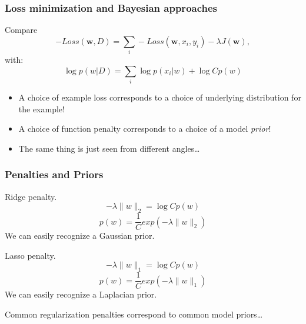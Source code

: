 \documentclass[usenames,dvipsnames]{beamer}
\newcommand{\w}{\mathbf{w}}
\newcommand{\voc}[1]{\emph{\color{ForestGreen}#1}}
\begin{document}
\begin{frame}\frametitle{Loss minimization and Bayesian approaches}

Compare
\begin{equation*}
-Loss(\w, D) = \sum_i - Loss(\w, x_i, y_i) - \lambda J(\w),
\end{equation*}
with:
\begin{equation*}
\log p(w|D) = \sum_i \log p(x_i|w) + \log C p(w)
\end{equation*}

\vspace{0.4cm}
\begin{itemize}
\item A choice of example loss corresponds to a choice of underlying
distribution for the example!
\item A choice of function penalty corresponds to a choice of a model
  \voc{prior}!
\item The same thing is just seen from different angles\ldots
\end{itemize}
\end{frame}


\begin{frame}\frametitle{Penalties and Priors}

Ridge penalty.
\begin{equation*}
-\lambda \|w\|_2 = \log C p(w)
\end{equation*}
\begin{equation*}
  p(w) = \frac{1}{C} exp(-\lambda \|w\|_2)
\end{equation*}
We can easily recognize a Gaussian prior.

\vspace{0.6cm}
Lasso penalty.
\begin{equation*}
-\lambda \|w\|_1 = \log C p(w)
\end{equation*}
\begin{equation*}
  p(w) = \frac{1}{C} exp(-\lambda \|w\|_1)
\end{equation*}
We can easily recognize a Laplacian prior.

\vspace{0.4cm}
Common regularization penalties correspond to common model
priors\ldots
\end{frame}



\end{document}
